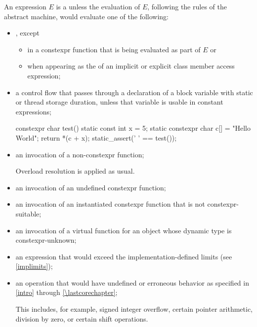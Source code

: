 \pnum
An expression $E$ is a 
unless the evaluation of $E$, following the rules of the abstract
machine, would evaluate one of the following:
\begin{itemize}
\item
{}, except
\begin{itemize}
\item
in a constexpr function
that is being evaluated as part of $E$ or
\item
when appearing as the  of
an implicit or explicit class member access expression;
\end{itemize}

\item
a control flow that passes through
a declaration of a block variable with
static or
thread storage duration,
unless that variable is usable in constant expressions;
\begin{example}
\begin{codeblock}
constexpr char test() {
  static const int x = 5;
  static constexpr char c[] = "Hello World";
  return *(c + x);
}
static_assert(' ' == test());
\end{codeblock}
\end{example}

\item
an invocation of a non-constexpr function;
\begin{footnote}
Overload resolution
is applied as usual.
\end{footnote}

\item
an invocation of an undefined constexpr function;

\item
an invocation of an instantiated constexpr function
that is not constexpr-suitable;

\item
an invocation of a virtual function
for an object whose dynamic type is constexpr-unknown;

\item
an expression that would exceed the implementation-defined
limits (see \ref{implimits});

\item
an operation that would have undefined or erroneous behavior
as specified in \ref{intro} through \ref{\lastcorechapter};
\begin{footnote}
This includes,
for example, signed integer overflow, certain
pointer arithmetic, division by
zero, or certain shift operations.
\end{footnote}


\end{itemize}
